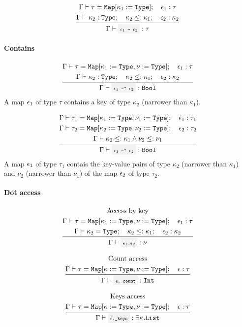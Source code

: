 \[
	\infrule{
		\EnvSym\then \tau=\Map[\kappa_1:=\Type] \semiq \expr_1:\tau \\*
		\EnvSym\then \kappa_2:\Type \semiq \kappa_2\narreq\kappa_1 \semiq \expr_2:\kappa_2
	}{
		\EnvSym\then \code{$\expr_1$ - $\expr_2$} : \tau
	}
\]


\paragraph{Contains}

\[
	\infrule{
		\EnvSym\then \tau = \Map[\kappa_1:=\Type,\nu:=\Type] \semiq \expr_1:\tau \\*
		\EnvSym\then \kappa_2:\Type \semiq \kappa_2 \narreq \kappa_1 \semiq \expr_2:\kappa_2
	}{
		\EnvSym\then \code{$\expr_1$ =\~{} $\expr_2$} : \Bool
	}
\]
A map $\epsilon_1$ of type $\tau$ contains a key of type $\kappa_2$ (narrower than
$\kappa_1$).

\[
	\infrule{
		\EnvSym\then \tau_1 = \Map[\kappa_1:=\Type,\nu_1:=\Type] \semiq \expr_1:\tau_1 \\*
		\EnvSym\then \tau_2 = \Map[\kappa_2:=\Type,\nu_2:=\Type] \semiq \expr_2:\tau_2 \\*
		\EnvSym\then \kappa_2 \narreq \kappa_1 \land \nu_2 \narreq \nu_1
	}{
		\EnvSym\then \code{$\expr_1$ =\~{} $\expr_2$} : \Bool
	}
\]
A map $\epsilon_1$ of type $\tau_1$ contais the key-value pairs of type $\kappa_2$
(narrower than $\kappa_1$) and $\nu_2$ (narrower than $\nu_1$) of the map
$\epsilon_2$ of type $\tau_2$.

\paragraph{Dot access}

\[
	\infrule{
		\text{Access by key}\\*
		\EnvSym\then \tau = \Map[\kappa_1:=\Type,\nu:=\Type] \semiq \expr_1:\tau \\*
		\EnvSym\then \kappa_2 = \Type \semiq \kappa_2 \narreq \kappa_1 \semiq \expr_2:\kappa_2
	}{
		\EnvSym\then \code{$\expr_1$.$\expr_2$}: \nu
	}
\]

\[
	\infrule{
		\text{Count access}\\*
		\EnvSym\then \tau = \Map[\kappa:=\Type,\nu:=\Type] \semiq \expr:\tau \\*
	}{
		\EnvSym\then \code{$\expr$.\_count}: \Int
	}
\]

\[
	\infrule{
		\text{Keys access}\\*
		\EnvSym\then \tau = \Map[\kappa:=\Type,\nu:=\Type] \semiq \expr:\tau \\*
	}{
		\EnvSym\then \code{$\expr$.\_keys}: \exists\kappa.\List
	}
\]

